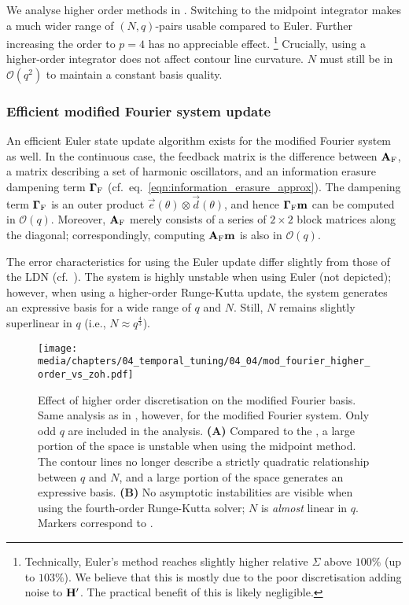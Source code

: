 We analyse higher order methods in .
Switching to the midpoint integrator makes a much wider range of $(N, q)$-pairs usable compared to Euler.
Further increasing the order to $p = 4$ has no appreciable effect.%
\footnote{Technically, Euler's method reaches slightly higher relative $\Sigma$ above $100\%$ (up to $103\%$). 
We believe that this is mostly due to the poor discretisation adding noise to $\mathbf{H}'$.
The practical benefit of this is likely negligible.}
Crucially, using a higher-order integrator does not affect contour line curvature. $N$ must still be in $\mathcal{O}(q^2)$ to maintain a constant basis quality.

\subsubsection{Efficient modified Fourier system update}

An efficient Euler state update algorithm exists for the modified Fourier \LTI system as well.
In the continuous case, the feedback matrix is the difference between $\mathbf{A}_\mathrm{F}$, a matrix describing a set of harmonic oscillators, and an information erasure dampening term $\mathbf{\Gamma}_\mathrm{F}$ (cf.~eq.~\ref{eqn:information_erasure_approx}).
The dampening term $\mathbf{\Gamma}_\mathrm{F}$ is an outer product $\vec e(\theta) \otimes \vec d(\theta)$, and hence $\mathbf{\Gamma}_\mathrm{F} \mathbf{m}$ can be computed in $\mathcal{O}(q)$.
Moreover, $\mathbf{A}_\mathrm{F}$ merely consists of a series of $2 \times 2$ block matrices along the diagonal; correspondingly, computing $\mathbf{A}_\mathrm{F} \mathbf{m}$ is also in $\mathcal{O}(q)$.

The error characteristics for using the Euler update differ slightly from those of the LDN (cf.~).
The system is highly unstable when using Euler (not depicted); however, when using a higher-order Runge-Kutta update, the system generates an expressive basis for a wide range of $q$ and $N$.
Still, $N$ remains slightly superlinear in $q$ (i.e., $N \approx q^{\frac{4}3}$).

\begin{figure}
	\texttt{[image: media/chapters/04\_temporal\_tuning/04\_04/mod\_fourier\_higher\_order\_vs\_zoh.pdf]}
	\caption[Effect of higher order discretisation on the modified Fourier basis]{Effect of higher order discretisation on the modified Fourier basis. Same analysis as in , however, for the modified Fourier system.
	Only odd $q$ are included in the analysis.
	\textbf{(A)} Compared to the \LDN, a large portion of the space is unstable when using the midpoint method.
	The contour lines no longer describe a strictly quadratic relationship between $q$ and $N$, and a large portion of the space generates an expressive basis.
	\textbf{(B)} No asymptotic instabilities are visible when using the fourth-order Runge-Kutta solver; $N$ is \emph{almost} linear in $q$.
	Markers correspond to .
	}
	\label{fig:mod_fourier_higher_order_vs_zoh}
\end{figure}

